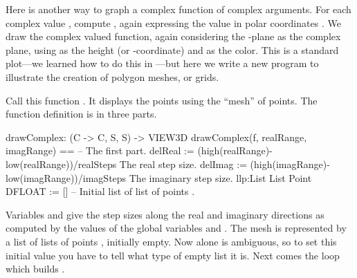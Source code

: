 
Here is another way to graph a complex function of complex
arguments.
For each complex value , compute , again
expressing the value in polar coordinates .
We draw the complex valued function, again considering the
-plane as the complex plane, using  as the
height (or -coordinate) and \smath{\theta} as the color.
This is a standard plot---we learned how to do this in
---but here we write a new program to illustrate
the creation of polygon meshes, or grids.

Call this function .
It displays the points using the ``mesh'' of points.
The function definition is in three parts.

\begin{xmpLines}
drawComplex: (C -> C, S, S) -> VIEW3D
drawComplex(f, realRange, imagRange) ==              -- The first part.
  delReal := (high(realRange)-low(realRange))/realSteps The real step size.
  delImag := (high(imagRange)-low(imagRange))/imagSteps The imaginary step size.
  llp:List List Point DFLOAT := []                   -- Initial list of list of points .
\end{xmpLines}

Variables  and  give the step
sizes along the real and imaginary directions as computed by the values
of the global variables  and .
The mesh is represented by a list of lists of points ,
initially empty.
Now \spad{[ ]} alone is ambiguous, so
to set this initial value
you have to tell \Language{} what type of empty list it is.
Next comes the loop which builds .


